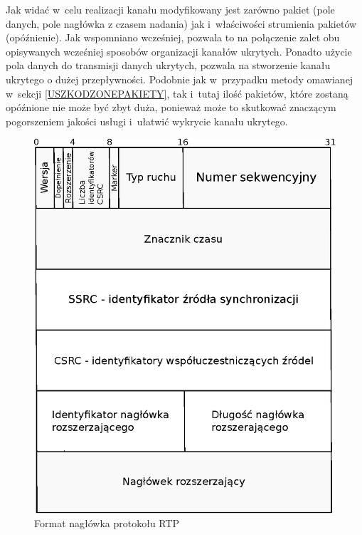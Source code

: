 \documentclass[a4paper, twoside, 12pt]{report}
\begin{document}
        Jak widać w~celu realizacji kanału modyfikowany jest zarówno pakiet (pole danych,
        pole nagłówka z czasem nadania) jak i~właściwości strumienia pakietów (opóźnienie).
        Jak wspomniano wcześniej, pozwala to na połączenie zalet obu opisywanych
        wcześniej sposobów organizacji kanałów ukrytych. Ponadto użycie pola danych
        do transmisji danych ukrytych, pozwala na stworzenie kanału ukrytego o
        dużej przepływności. Podobnie jak w~przypadku metody omawianej w~sekcji
        \ref{USZKODZONEPAKIETY}, tak i~tutaj ilość pakietów, które zostaną opóźnione
        nie może być zbyt duża, ponieważ może to skutkować znaczącym pogorszeniem
        jakości usługi i~ułatwić wykrycie kanału ukrytego.

        \begin{figure}[h]
                \centering
                \includegraphics[scale=0.8]{rtp_header}
                \caption{Format nagłówka protokołu RTP}
                \label{RTPHEADER}
        \end{figure}
\end{document}
